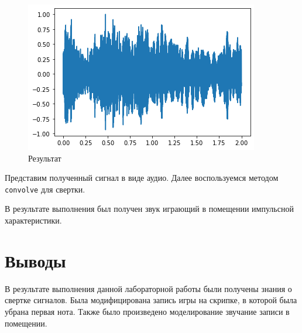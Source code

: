 \documentclass[a4paper, 14pt]{extarticle}
\begin{document}
        \begin{figure}[H]
        \centering
        \includegraphics[width=0.8\linewidth]{scream_result}
        \caption{Результат}
        \label{fig:scream_result}
    \end{figure}

    Представим полученный сигнал в виде аудио.
    Далее воспользуемся методом \texttt{convolve} для свертки.

    В результате выполнения был получен звук играющий в помещении импульсной характеристики.

    \newpage


    \section{Выводы}
    \label{sec:conclusions}

    В результате выполнения данной лабораторной работы были получены знания о свертке сигналов.
    Была модифицирована запись игры на скрипке, в которой была убрана первая нота.
    Также было произведено моделирование звучание записи в помещении.
\end{document}
